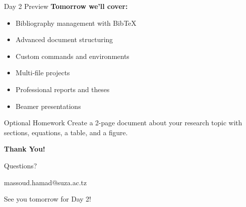 \documentclass[aspectratio=169]{beamer}
\begin{document}
	\begin{frame}{Day 2 Preview}
		\textbf{Tomorrow we'll cover:}
		
		\begin{itemize}
			\item Bibliography management with BibTeX
			\item Advanced document structuring
			\item Custom commands and environments
			\item Multi-file projects
			\item Professional reports and theses
			\item Beamer presentations
		\end{itemize}
		
		\vspace{1em}
		
		\begin{block}{Optional Homework}
			Create a 2-page document about your research topic with sections, equations, a table, and a figure.
		\end{block}
	\end{frame}
	
	\begin{frame}
		\begin{center}
			\Huge\textbf{Thank You!}
			
			\vspace{2em}
			
			\Large Questions?
			
			\vspace{1em}
			
			\normalsize
			massoud.hamad@suza.ac.tz
			
			\vspace{2em}
			
			\large
			See you tomorrow for Day 2!
		\end{center}
	\end{frame}
	
\end{document}
